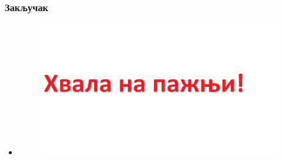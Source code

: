 \documentclass{beamer}
\begin{document}
\begin{frame}[fragile]\frametitle{Закључак}
	\begin{itemize}
	\item 

		\begin{figure}[h!]
\begin{center}
\includegraphics[scale=0.25]{Untitled1.png}
\end{center}
\end{figure}


\end{itemize}

\end{frame}
	
\end{document}
